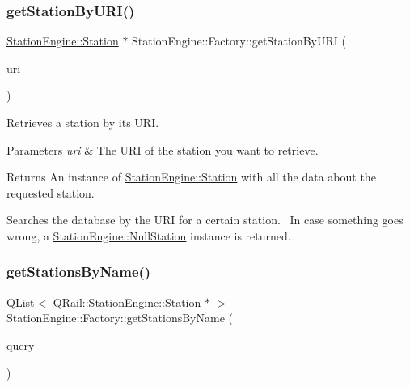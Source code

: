 \subsubsection{\texorpdfstring{getStationByURI()}{getStationByURI()}}
{\footnotesize\ttfamily \mbox{\hyperlink{classQRail_1_1StationEngine_1_1Station}{Station\+Engine\+::\+Station}} $\ast$ Station\+Engine\+::\+Factory\+::get\+Station\+By\+U\+RI (\begin{DoxyParamCaption}\item[{const Q\+Url \&}]{uri }\end{DoxyParamCaption})}



Retrieves a station by its U\+RI. 


\begin{DoxyParams}{Parameters}
{\em uri} & The U\+RI of the station you want to retrieve. \\
\hline
\end{DoxyParams}
\begin{DoxyReturn}{Returns}
An instance of \mbox{\hyperlink{classQRail_1_1StationEngine_1_1Station}{Station\+Engine\+::\+Station}} with all the data about the requested station.
\end{DoxyReturn}
Searches the database by the U\+RI for a certain station.~\newline
 In case something goes wrong, a \mbox{\hyperlink{classQRail_1_1StationEngine_1_1NullStation}{Station\+Engine\+::\+Null\+Station}} instance is returned. \mbox{\label{classQRail_1_1StationEngine_1_1Factory_a892a259deeb2911edda868a09549b68a}} 
\subsubsection{\texorpdfstring{getStationsByName()}{getStationsByName()}}
{\footnotesize\ttfamily Q\+List$<$ \mbox{\hyperlink{classQRail_1_1StationEngine_1_1Station}{Q\+Rail\+::\+Station\+Engine\+::\+Station}} $\ast$ $>$ Station\+Engine\+::\+Factory\+::get\+Stations\+By\+Name (\begin{DoxyParamCaption}\item[{const Q\+String \&}]{query }\end{DoxyParamCaption})}



